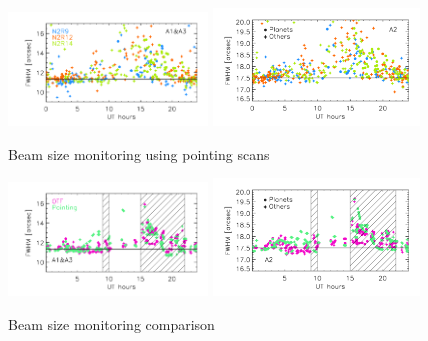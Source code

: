 \begin{figure}[ht!]
  \begin{center}
    \includegraphics[clip=true, trim={0.9cm, 0.5cm, 0.5cm, 0.5cm}, width=0.4725\textwidth]{Figures/Beams/Beam_monitoring_with_pointings_vs_ut_1mm.pdf}
    \includegraphics[clip=true, trim={0.5cm, 0.5cm, 0.5cm, 0.5cm}, width=0.4875\textwidth]{Figures/Beams/Beam_monitoring_with_pointings_vs_ut_a2.pdf}
    \caption[Beam size monitoring using pointing scans]{Beam size monitoring using pointing scans} 
\label{fig:beam_monitoring_pointing}
\end{center}
\end{figure}

\begin{figure}[ht!]
  \begin{center}
    \includegraphics[clip=true, trim={0.9cm, 0.5cm, 0.5cm, 0.5cm}, width=0.4725\textwidth]{Figures/Beams/Beam_monitoring_with_otfs_vs_ut_compare_pointings_1mm.pdf}
    \includegraphics[clip=true, trim={0.5cm, 0.5cm, 0.5cm, 0.5cm}, width=0.4875\textwidth]{Figures/Beams/Beam_monitoring_with_otfs_vs_ut_compare_pointings_a2.pdf}
    \caption[Beam size monitoring comparison]{Beam size monitoring comparison} 
\label{fig:beam_monitoring_compare}
\end{center}
\end{figure}

